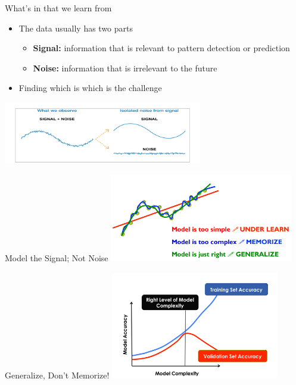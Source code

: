 \documentclass[aspectratio=169,14pt,usenames,dvipsnames]{beamer}
\begin{document}
\begin{frame}{What’s in that we learn from}
\begin{itemize}

\item The data usually has two parts
\begin{itemize}
\item \alert{\textbf{Signal:}} information that is relevant to pattern detection or prediction
\item \alert{\textbf{Noise:}} information that is irrelevant to the future
\end{itemize}
\item Finding which is which is the challenge
\end{itemize}

\centering
\includegraphics[width=0.65\textwidth, height=0.35\textheight]{Images/AIML_OFG_10.png}

\end{frame}

\begin{frame}{Model the Signal; Not Noise}
\centering
\includegraphics[width=0.6\textwidth, height=0.5\textheight]{Images/AIML_OFG_11.png}
\end{frame}

\begin{frame}{Generalize, Don’t Memorize!}
\centering
\includegraphics[width=0.55\textwidth, height=0.55\textheight]{Images/AIML_OFG_12.png}
\end{frame}
\end{document}
